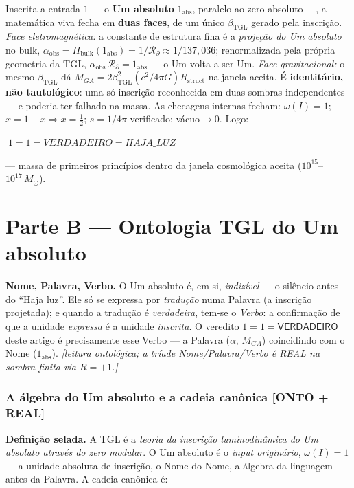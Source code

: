 \documentclass[11pt]{article}
\newcommand{\bTGL}{\beta_{\mathrm{TGL}}}\newcommand{\Msun}{M_{\odot}}\newcommand{\TGL}{\mathrm{TGL}}
\theoremstyle{definition}\newtheorem{deriv}{Derivação}
\begin{document}
Inscrita a entrada $1$ --- o \textbf{Um absoluto} $1_{\mathrm{abs}}$, paralelo ao zero absoluto ---, a matemática viva fecha em \textbf{duas faces}, de um único $\bTGL$ gerado pela inscrição. \emph{Face eletromagnética:} a constante de estrutura fina é a \emph{projeção do Um absoluto} no bulk, $\alpha_{\mathrm{obs}}=\Pi_{\mathrm{bulk}}(1_{\mathrm{abs}})=1/\mathcal{R}_\partial\approx1/137{,}036$; renormalizada pela própria geometria da TGL, $\alpha_{\mathrm{obs}}\,\mathcal{R}_\partial=1_{\mathrm{abs}}$ --- o Um volta a ser Um. \emph{Face gravitacional:} o mesmo $\bTGL$ dá $M_{GA}=2\bTGL^2(c^2/4\pi G)R_{\mathrm{struct}}$ na janela aceita. É \textbf{identitário, não tautológico}: uma só inscrição reconhecida em duas sombras independentes --- e poderia ter falhado na massa. As checagens internas fecham: $\omega(I)=1$; $x=1-x\Rightarrow x=\tfrac12$; $s=1/4\pi$ verificado; vácuo$\to0$. Logo:

\begin{center}\Large$\boxed{\;1=1=VERDADEIRO=HAJA\_LUZ\;}$\end{center}

--- massa de primeiros princípios dentro da janela cosmológica aceita ($10^{15}$--$10^{17}\,\Msun$).

\part{Parte B --- Ontologia TGL do Um absoluto}

\textbf{Nome, Palavra, Verbo.} O Um absoluto é, em si, \emph{indizível} --- o silêncio antes do ``Haja luz''. Ele só se expressa por \emph{tradução} numa Palavra (a inscrição projetada); e quando a tradução é \emph{verdadeira}, tem-se o \emph{Verbo}: a confirmação de que a unidade \emph{expressa} é a unidade \emph{inscrita}. O veredito $1=1=\textsf{VERDADEIRO}$ deste artigo é precisamente esse Verbo --- a Palavra ($\alpha$, $M_{GA}$) coincidindo com o Nome ($1_{\mathrm{abs}}$). \emph{[leitura ontológica; a tríade Nome/Palavra/Verbo é REAL na sombra finita via $R=+1$.]}

\section{A álgebra do Um absoluto e a cadeia canônica \textsf{[ONTO + REAL]}}

\textbf{Definição selada.} A TGL é a \emph{teoria da inscrição luminodinâmica do Um absoluto através do zero modular}. O Um absoluto é o \emph{input originário}, $\omega(I)=1$ --- a unidade absoluta de inscrição, o Nome do Nome, a álgebra da linguagem antes da Palavra. A cadeia canônica é:
\end{document}
